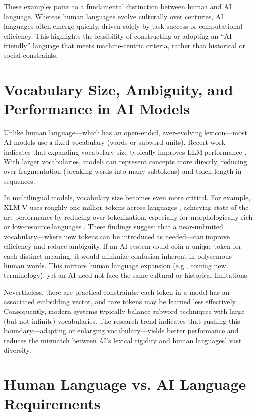 \documentclass{article} %
\begin{document}
These examples point to a fundamental distinction between human and AI language. Whereas human languages evolve culturally over centuries, AI languages often emerge quickly, driven solely by task success or computational efficiency. This highlights the feasibility of constructing or adopting an “AI-friendly” language that meets machine-centric criteria, rather than historical or social constraints.


\section{Vocabulary Size, Ambiguity, and Performance in AI Models}
Unlike human language—which has an open-ended, ever-evolving lexicon—most AI models use a fixed vocabulary (words or subword units). Recent work indicates that expanding vocabulary size typically improves LLM performance \cite{Takase2024}. With larger vocabularies, models can represent concepts more directly, reducing over-fragmentation (breaking words into many subtokens) and token length in sequences.

In multilingual models, vocabulary size becomes even more critical. For example, XLM-V uses roughly one million tokens across languages \cite{Liang2023}, achieving state-of-the-art performance by reducing over-tokenization, especially for morphologically rich or low-resource languages . These findings suggest that a near-unlimited vocabulary—where new tokens can be introduced as needed—can improve efficiency and reduce ambiguity. If an AI system could coin a unique token for each distinct meaning, it would minimize confusion inherent in polysemous human words. This mirrors human language expansion (e.g., coining new terminology), yet an AI need not face the same cultural or historical limitations.

Nevertheless, there are practical constraints: each token in a model has an associated embedding vector, and rare tokens may be learned less effectively. Consequently, modern systems typically balance subword techniques with large (but not infinite) vocabularies. The research trend indicates that pushing this boundary—adapting or enlarging vocabulary—yields better performance and reduces the mismatch between AI’s lexical rigidity and human languages’ vast diversity.

\section{Human Language vs. AI Language Requirements}
\end{document}
